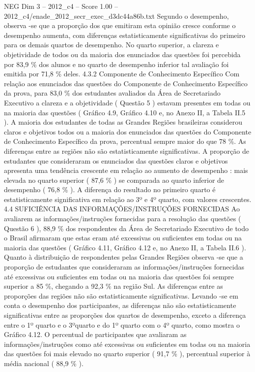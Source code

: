 \begin{textsample}{NEG Dim 3 – 2012\_c4 – Score 1.00 – 2012\_c4/enade\_2012\_secr\_exec\_d3dc44a86b.txt}
Segundo o desempenho, observa -se que a proporção dos que emitiram esta opinião cresce conforme o desempenho aumenta, com diferenças estatisticamente significativas do primeiro para os demais quartos de desempenho.
No quarto superior, a clareza e objetividade de todos ou da maioria dos enunciados das questões foi percebida por 83,9 \% dos alunos e no quarto de desempenho inferior tal avaliação foi emitida por 71,8 \% deles. 4.3.2 Componente de Conhecimento Específico Com relação aos enunciados das questões do Componente de Conhecimento Específico da prova, para 83,0 \% dos estudantes avaliados da Área de Secretariado Executivo a clareza e a objetividade ( Questão 5 ) estavam presentes em todas ou na maioria das questões ( Gráfico 4.9, Gráfico 4.10 e, no Anexo II, a Tabela II.5 ).
A maioria dos estudantes de todas as Grandes Regiões brasileiras considerou claros e objetivos todos ou a maioria dos enunciados das questões do Componente de Conhecimento Específico da prova, percentual sempre maior do que 78 \%.
As diferenças entre as regiões não são estatisticamente significativas.
A proporção de estudantes que consideraram os enunciados das questões claros e objetivos apresenta uma tendência crescente em relação ao aumento de desempenho : mais elevada no quarto superior ( 87,6 \% ) se comparada ao quarto inferior de desempenho ( 76,8 \% ).
A diferença do resultado no primeiro quarto é estatisticamente significativa em relação ao 3º e 4º quarto, com valores crescentes. 4.4 SUFICIÊNCIA DAS INFORMAÇÕES/INSTRUÇÕES FORNECIDAS Ao avaliarem as informações/instruções fornecidas para a resolução das questões ( Questão 6 ), 88,9 \% dos respondentes da Área de Secretariado Executivo de todo o Brasil afirmaram que estas eram até excessivas ou suficientes em todas ou na maioria das questões ( Gráfico 4.11, Gráfico 4.12 e, no Anexo II, a Tabela II.6 ).
Quanto à distribuição de respondentes pelas Grandes Regiões observa -se que a proporção de estudantes que consideraram as informações/instruções fornecidas até excessivas ou suficientes em todas ou na maioria das questões foi sempre superior a 85 \%, chegando a 92,3 \% na região Sul.
As diferenças entre as proporções das regiões não são estatisticamente significativas.
Levando -se em conta o desempenho dos participantes, as diferenças não são estatisticamente significativas entre as proporções dos quartos de desempenho, exceto a diferença entre o 1º quarto e o 3ºquarto e do 1º quarto com o 4º quarto, como mostra o Gráfico 4.12.
O percentual de participantes que avaliaram as informações/instruções como até excessivas ou suficientes em todas ou na maioria das questões foi mais elevado no quarto superior ( 91,7 \% ), percentual superior à média nacional ( 88,9 \% ).

\end{textsample}
